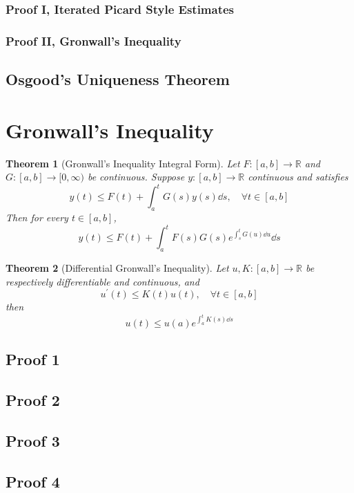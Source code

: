 \documentclass[a4paper, 12pt]{book}
\newtheorem{theorem}{Theorem}[chapter]
\begin{document}
\subsubsection{Proof I, Iterated Picard Style Estimates}
\subsubsection{Proof II, Gronwall's Inequality}
\subsection{Osgood's Uniqueness Theorem}
\section{Gronwall's Inequality}
\begin{theorem}
	[Gronwall's Inequality Integral Form]
	Let \( F:[a,b]\to \mathbb{R} \) and \( G: [a,b]\to [0,\infty)  \) be continuous. Suppose \( y:[a,b]\to \mathbb{R} \) continuous and satisfies \[
		y(t)\leq F(t)+\int_{a}^{t} G(s)y(s) \dd s, \quad \forall t\in[a,b]
	\]
	Then for every \( t\in[a,b] \), \[
		y(t)\leq F(t)+\int_{a}^{t} F(s)G(s)e^{\int_{s}^{t} G(u) \dd u} \dd s
	\]

\end{theorem}
\begin{theorem}
	[Differential Gronwall's Inequality]
	Let \( u, K:[a,b]\to \mathbb{R} \) be respectively differentiable and continuous, and \[
		u^\prime(t)\leq K(t) u(t) , \quad \forall t\in[a,b]
	\]
	then
	\[
		u(t)\leq u(a)e^{\int_{a}^{t} K(s) \dd s}
	\]
\end{theorem}
\subsection{Proof 1}
\subsection{Proof 2}
\subsection{Proof 3}
\subsection{Proof 4}
\end{document}
